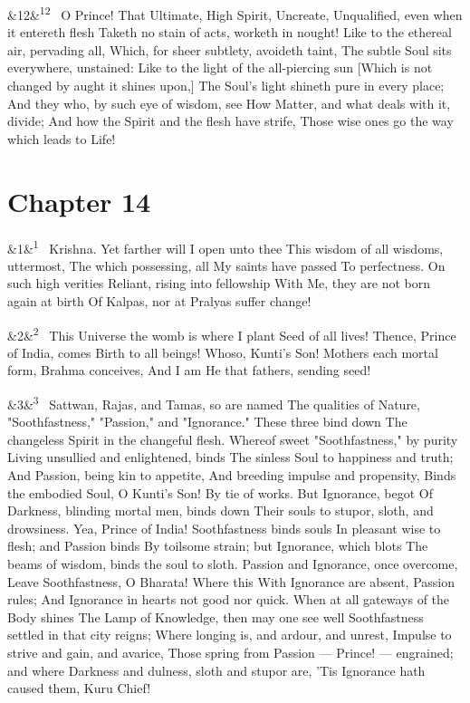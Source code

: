 \documentclass[12pt]{article}
\newcommand{\para}[1][]{\par\noindent\ifx&#1&\else\textsuperscript{\footnotesize #1}~\fi}
\begin{document}
\para[12] O Prince! That Ultimate, High Spirit, Uncreate, Unqualified, even when it entereth flesh Taketh no stain of acts, worketh in nought! Like to the ethereal air, pervading all, Which, for sheer subtlety, avoideth taint, The subtle Soul sits everywhere, unstained: Like to the light of the all-piercing sun [Which is not changed by aught it shines upon,] The Soul's light shineth pure in every place; And they who, by such eye of wisdom, see How Matter, and what deals with it, divide; And how the Spirit and the flesh have strife, Those wise ones go the way which leads to Life!

\section*{Chapter 14}

\para[1] Krishna. Yet farther will I open unto thee This wisdom of all wisdoms, uttermost, The which possessing, all My saints have passed To perfectness. On such high verities Reliant, rising into fellowship With Me, they are not born again at birth Of Kalpas, nor at Pralyas suffer change!

\para[2] This Universe the womb is where I plant Seed of all lives! Thence, Prince of India, comes Birth to all beings! Whoso, Kunti's Son! Mothers each mortal form, Brahma conceives, And I am He that fathers, sending seed!

\para[3] Sattwan, Rajas, and Tamas, so are named The qualities of Nature, "Soothfastness," "Passion," and "Ignorance." These three bind down The changeless Spirit in the changeful flesh. Whereof sweet "Soothfastness," by purity Living unsullied and enlightened, binds The sinless Soul to happiness and truth; And Passion, being kin to appetite, And breeding impulse and propensity, Binds the embodied Soul, O Kunti's Son! By tie of works. But Ignorance, begot Of Darkness, blinding mortal men, binds down Their souls to stupor, sloth, and drowsiness. Yea, Prince of India! Soothfastness binds souls In pleasant wise to flesh; and Passion binds By toilsome strain; but Ignorance, which blots The beams of wisdom, binds the soul to sloth. Passion and Ignorance, once overcome, Leave Soothfastness, O Bharata! Where this With Ignorance are absent, Passion rules; And Ignorance in hearts not good nor quick. When at all gateways of the Body shines The Lamp of Knowledge, then may one see well Soothfastness settled in that city reigns; Where longing is, and ardour, and unrest, Impulse to strive and gain, and avarice, Those spring from Passion --- Prince! --- engrained; and where Darkness and dulness, sloth and stupor are, 'Tis Ignorance hath caused them, Kuru Chief!
\end{document}

